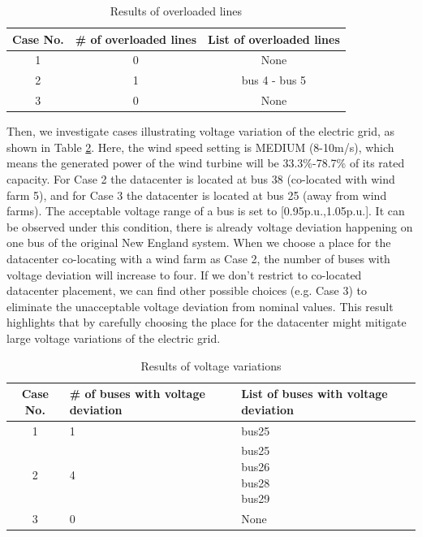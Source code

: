 \begin{table}[ht]
\begin{center}
\caption{Results of overloaded lines}
\begin{tabular}{|c|c|c|}
\hline
Case No. & \# of overloaded lines & List of overloaded lines \\
\hline
1 & 0 & None\\
2 & 1 &  bus 4 - bus 5 \\
3 & 0 & None \\

\hline

\end{tabular}
\label{tab:results-linevio}
\end{center}
\end{table}

Then, we investigate cases illustrating voltage variation of the electric grid, as shown in Table \ref{tab:results-volvio}. Here, the wind speed setting is MEDIUM (8-10m/s), which means the generated power of the wind turbine will be 33.3\%-78.7\% of its rated capacity. For Case 2 the datacenter is located at bus 38 (co-located with wind farm 5), and for Case 3 the datacenter is located at bus 25 (away from wind farms). The acceptable voltage range of a bus is set to [0.95p.u.,1.05p.u.]. It can be observed under this condition, there is already voltage deviation happening on one bus of the original New England system. When we choose a place for the datacenter co-locating with a wind farm as Case 2, the number of buses with voltage deviation will increase to four. If we don't restrict to co-located datacenter placement, we can find other possible choices (e.g. Case 3) to eliminate the unacceptable voltage deviation from nominal values. This result highlights that by carefully choosing the place for the datacenter might mitigate large voltage variations of the electric grid.

\begin{table}[ht]
\begin{center}
\caption{Results of voltage variations}
\begin{tabular}{|c|p{1in}|p{1in}|}
\hline
Case No. & \# of buses with voltage deviation & List of buses with voltage deviation  \\
\hline
1 & 1 & bus25\\
\hline
2 & 4 & \tabincell{c}{bus25\\bus26\\bus28\\bus29}\\
\hline
3 & 0 & None \\

\hline

\end{tabular}
\label{tab:results-volvio}
\end{center}
\end{table}


